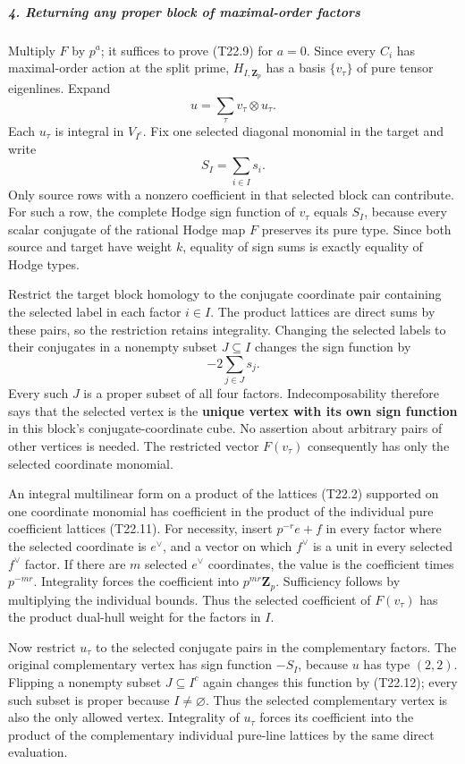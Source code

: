 \subparagraph{4. Returning any proper block of maximal-order factors}\label{returning-any-proper-block-of-maximal-order-factors}

Multiply \(F\) by \(p^a\); it suffices to prove (T22.9) for \(a=0\). Since every \(C_i\) has maximal-order action at the split prime, \(H_{I,\mathbf Z_p}\) has a basis \(\{v_\tau\}\) of pure tensor eigenlines. Expand \[
 u=\sum_\tau v_\tau\otimes u_\tau .
\] Each \(u_\tau\) is integral in \(V_{I^c}\). Fix one selected diagonal monomial in the target and write \[
 S_I=\sum_{i\in I}s_i.
\] Only source rows with a nonzero coefficient in that selected block can contribute. For such a row, the complete Hodge sign function of \(v_\tau\) equals \(S_I\), because every scalar conjugate of the rational Hodge map \(F\) preserves its pure type. Since both source and target have weight \(k\), equality of sign sums is exactly equality of Hodge types.

Restrict the target block homology to the conjugate coordinate pair containing the selected label in each factor \(i\in I\). The product lattices are direct sums by these pairs, so the restriction retains integrality. Changing the selected labels to their conjugates in a nonempty subset \(J\subseteq I\) changes the sign function by \[
 -2\sum_{j\in J}s_j.
 \tag{T22.12}
\] Every such \(J\) is a proper subset of all four factors. Indecomposability therefore says that the selected vertex is the \textbf{unique vertex with its own sign function} in this block's conjugate-coordinate cube. No assertion about arbitrary pairs of other vertices is needed. The restricted vector \(F(v_\tau)\) consequently has only the selected coordinate monomial.

An integral multilinear form on a product of the lattices (T22.2) supported on one coordinate monomial has coefficient in the product of the individual pure coefficient lattices (T22.11). For necessity, insert \(p^{-r}e+f\) in every factor where the selected coordinate is \(e^\vee\), and a vector on which \(f^\vee\) is a unit in every selected \(f^\vee\) factor. If there are \(m\) selected \(e^\vee\) coordinates, the value is the coefficient times \(p^{-mr}\). Integrality forces the coefficient into \(p^{mr}\mathbf Z_p\). Sufficiency follows by multiplying the individual bounds. Thus the selected coefficient of \(F(v_\tau)\) has the product dual-hull weight for the factors in \(I\).

Now restrict \(u_\tau\) to the selected conjugate pairs in the complementary factors. The original complementary vertex has sign function \(-S_I\), because \(u\) has type \((2,2)\). Flipping a nonempty subset \(J\subseteq I^c\) again changes this function by (T22.12); every such subset is proper because \(I\ne\varnothing\). Thus the selected complementary vertex is also the only allowed vertex. Integrality of \(u_\tau\) forces its coefficient into the product of the complementary individual pure-line lattices by the same direct evaluation.

